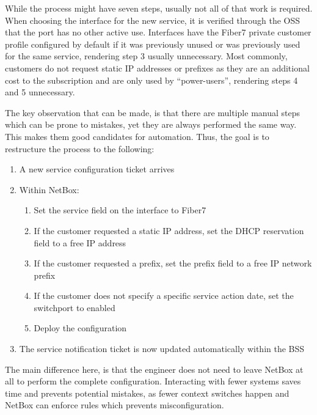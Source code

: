 While the process might have seven steps, usually not all of that work is required.
When choosing the interface for the new service, it is verified through the \acrshort{OSS}
that the port has no other active use.
Interfaces have the Fiber7 private customer profile configured by default
if it was previously unused or was previously used for the same service,
rendering step 3 usually unnecessary.
Most commonly, customers do not request static IP addresses or prefixes as
they are an additional cost to the subscription and are only used by ``power-users'',
rendering steps 4 and 5 unnecessary.

The key observation that can be made, is that there are multiple manual steps
which can be prone to mistakes, yet they are always performed the same way. This makes
them good candidates for automation. Thus, the goal is to restructure the process
to the following:

\begin{enumerate}
  \item A new service configuration ticket arrives
  \item Within NetBox:
  \begin{enumerate}
    \item Set the service field on the interface to Fiber7
    \item If the customer requested a static IP address, set the DHCP reservation field to a free IP address
    \item If the customer requested a prefix, set the prefix field to a free IP network prefix
    \item If the customer does not specify a specific service action date, set the switchport to enabled
    \item Deploy the configuration
  \end{enumerate}
  \item The service notification ticket is now updated automatically within the BSS
\end{enumerate}


The main difference here, is that the engineer does not need to leave NetBox at all to perform the complete configuration.
Interacting with fewer systems saves time and prevents potential mistakes, as fewer context switches happen and NetBox
can enforce rules which prevents misconfiguration.

